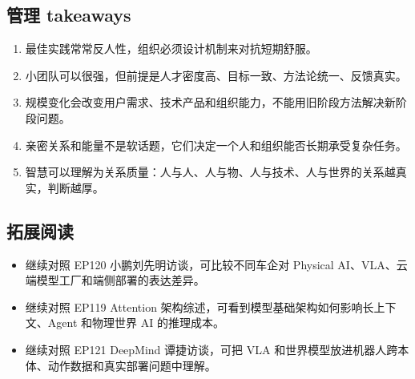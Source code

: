 \documentclass[a4paper]{article}
\begin{document}
\subsection{管理 takeaways}

\begin{enumerate}
\item 最佳实践常常反人性，组织必须设计机制来对抗短期舒服。
\item 小团队可以很强，但前提是人才密度高、目标一致、方法论统一、反馈真实。
\item 规模变化会改变用户需求、技术产品和组织能力，不能用旧阶段方法解决新阶段问题。
\item 亲密关系和能量不是软话题，它们决定一个人和组织能否长期承受复杂任务。
\item 智慧可以理解为关系质量：人与人、人与物、人与技术、人与世界的关系越真实，判断越厚。
\end{enumerate}

\subsection{拓展阅读}

\begin{itemize}
\item 继续对照 EP120 小鹏刘先明访谈，可比较不同车企对 Physical AI、VLA、云端模型工厂和端侧部署的表达差异。
\item 继续对照 EP119 Attention 架构综述，可看到模型基础架构如何影响长上下文、Agent 和物理世界 AI 的推理成本。
\item 继续对照 EP121 DeepMind 谭捷访谈，可把 VLA 和世界模型放进机器人跨本体、动作数据和真实部署问题中理解。
\end{itemize}
\end{document}
